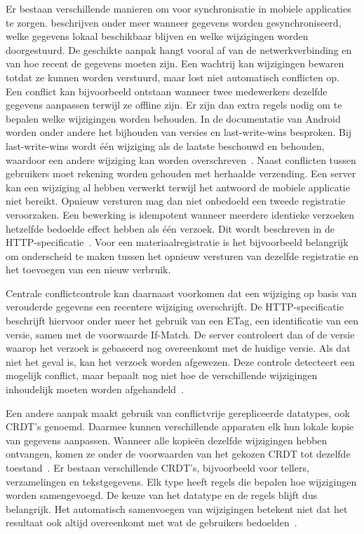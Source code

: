 Er bestaan verschillende manieren om voor synchronisatie in mobiele applicaties te zorgen.
\textcite{McCormickSchmidt2012} beschrijven onder meer wanneer gegevens worden gesynchroniseerd,
welke gegevens lokaal beschikbaar blijven en welke wijzigingen worden doorgestuurd. De geschikte
aanpak hangt vooral af van de netwerkverbinding en van hoe recent de gegevens moeten zijn.
Een wachtrij kan wijzigingen bewaren totdat ze kunnen worden verstuurd, maar lost niet automatisch conflicten op.
Een conflict kan bijvoorbeeld ontstaan wanneer twee medewerkers dezelfde gegevens aanpassen terwijl ze offline zijn.
Er zijn dan extra regels nodig om te bepalen welke wijzigingen worden behouden. In de documentatie van Android worden
onder andere het bijhouden van versies en last-write-wins besproken. Bij last-write-wins wordt één wijziging als de laatste
beschouwd en behouden, waardoor een andere wijziging kan worden overschreven~\autocite{Google2026OfflineFirst}.
Naast conflicten tussen gebruikers moet rekening worden gehouden met herhaalde verzending.
Een server kan een wijziging al hebben verwerkt terwijl het antwoord de mobiele applicatie niet bereikt.
Opnieuw versturen mag dan niet onbedoeld een tweede registratie veroorzaken. Een bewerking is idempotent wanneer meerdere
identieke verzoeken hetzelfde bedoelde effect hebben als één verzoek. Dit wordt beschreven in
de HTTP-specificatie~\autocite{FieldingEtAl2022}. Voor een materiaalregistratie is het bijvoorbeeld belangrijk om
onderscheid te maken tussen het opnieuw versturen van dezelfde registratie en het toevoegen van een nieuw verbruik.

Centrale conflictcontrole kan daarnaast voorkomen dat een wijziging op basis van verouderde gegevens een recentere wijziging overschrijft.
De HTTP-specificatie beschrijft hiervoor onder meer het gebruik van een ETag, een identificatie van een versie, samen met de
voorwaarde If-Match. De server controleert dan of de versie waarop het verzoek is gebaseerd nog overeenkomt met de huidige versie.
Als dat niet het geval is, kan het verzoek worden afgewezen. Deze controle detecteert een mogelijk conflict, maar bepaalt nog niet
hoe de verschillende wijzigingen inhoudelijk moeten worden afgehandeld~\autocite{FieldingEtAl2022}.

Een andere aanpak maakt gebruik van conflictvrije gerepliceerde datatypes, ook CRDT's genoemd. Daarmee kunnen verschillende
apparaten elk hun lokale kopie van gegevens aanpassen. Wanneer alle kopieën dezelfde wijzigingen hebben ontvangen, komen ze
onder de voorwaarden van het gekozen CRDT tot dezelfde toestand~\autocite{PreguicaEtAl2018}. Er bestaan verschillende CRDT's,
bijvoorbeeld voor tellers, verzamelingen en tekstgegevens. Elk type heeft regels die bepalen hoe wijzigingen worden samengevoegd.
De keuze van het datatype en de regels blijft dus belangrijk. Het automatisch samenvoegen van wijzigingen betekent niet dat
het resultaat ook altijd overeenkomt met wat de gebruikers bedoelden~\autocite{PreguicaEtAl2018}.

